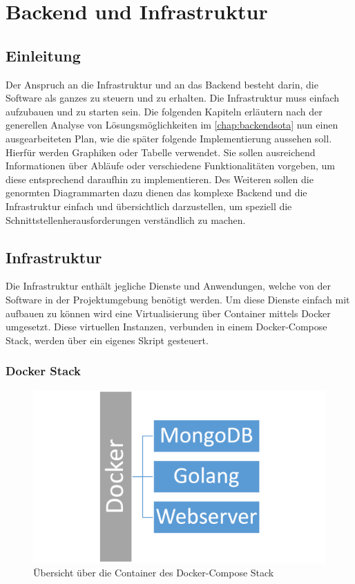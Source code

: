 
\section{Backend und Infrastruktur}
\label{chapter:conceptbi}
\subsection{Einleitung}
Der Anspruch an die Infrastruktur und an das Backend besteht darin, die Software als ganzes zu steuern und zu erhalten. Die Infrastruktur muss einfach aufzubauen und zu starten sein. Die folgenden Kapiteln erläutern nach der generellen Analyse von Lösungsmöglichkeiten im \autoref{chap:backendsota} nun einen ausgearbeiteten Plan, wie die später folgende Implementierung aussehen soll. Hierfür werden Graphiken oder Tabelle verwendet. Sie sollen ausreichend Informationen über Abläufe oder verschiedene Funktionalitäten vorgeben, um diese entsprechend daraufhin zu implementieren. Des Weiteren sollen die genormten Diagrammarten dazu dienen das komplexe Backend und die Infrastruktur einfach und übersichtlich darzustellen, um speziell die Schnittstellenherausforderungen verständlich zu machen.
\subsection{Infrastruktur}
Die Infrastruktur enthält jegliche Dienste und Anwendungen, welche von der Software in der Projektumgebung benötigt werden. Um diese Dienste einfach mit aufbauen zu können wird eine Virtualisierung über Container mittels Docker umgesetzt. Diese virtuellen Instanzen, verbunden in einem Docker-Compose Stack, werden über ein eigenes Skript gesteuert.
\subsubsection{Docker Stack}
\begin{figure}[H]
	\centering
	\includegraphics[width=\linewidth]{images/mbeier_konzept/docker-stack}
	\caption[Docker-Compose Stack]{Übersicht über die Container des Docker-Compose Stack}
	\label{fig:docker-stack}
\end{figure}

